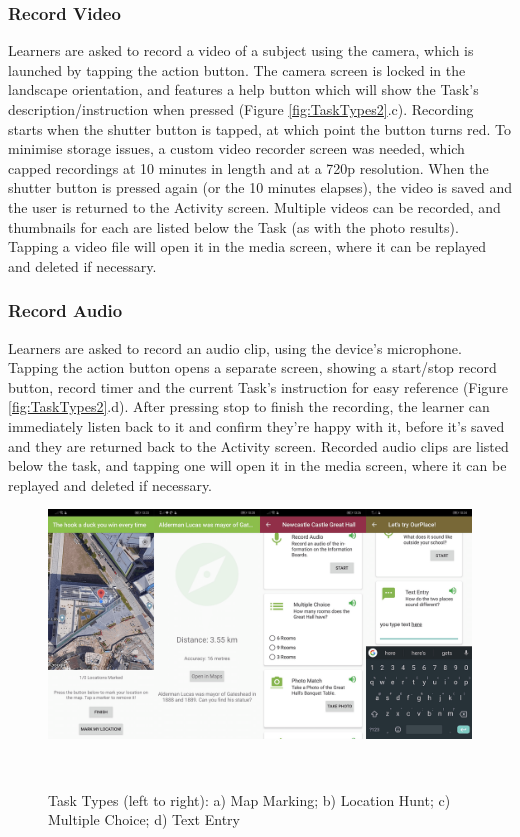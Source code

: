 \subsubsection*{Record Video}
Learners are asked to record a video of a subject using the camera, which is launched by tapping the action button. The camera screen is locked in the landscape orientation, and features a help button which will show the Task's description/instruction when pressed (Figure \ref{fig:TaskTypes2}.c). Recording starts when the shutter button is tapped, at which point the button turns red. To minimise storage issues, a custom video recorder screen was needed, which capped recordings at 10 minutes in length and at a 720p resolution. When the shutter button is pressed again (or the 10 minutes elapses), the video is saved and the user is returned to the Activity screen. Multiple videos can be recorded, and thumbnails for each are listed below the Task (as with the photo results). Tapping a video file will open it in the media screen, where it can be replayed and deleted if necessary.

\subsubsection*{Record Audio}
Learners are asked to record an audio clip, using the device's microphone. Tapping the action button opens a separate screen, showing a start/stop record button, record timer and the current Task's instruction for easy reference (Figure \ref{fig:TaskTypes2}.d). After pressing stop to finish the recording, the learner can immediately listen back to it and confirm they're happy with it, before it's saved and they are returned back to the Activity screen. Recorded audio clips are listed below the task, and tapping one will open it in the media screen, where it can be replayed and deleted if necessary.

\begin{figure}
  \centering
  \includegraphics[width=1\columnwidth]{images/chapter05/tasktypes3.png}
  \caption{Task Types (left to right): a) Map Marking; b) Location Hunt; c) Multiple Choice; d) Text Entry}~\label{fig:TaskTypes3}
\end{figure}

